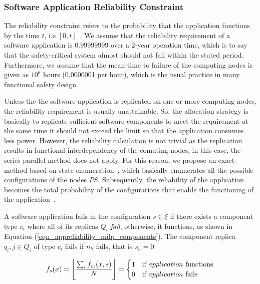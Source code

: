 \subsubsection{Software Application Reliability Constraint}
The reliability constraint refers to the probability that the application functions by the time $t$, i.e $[0,t]$~\cite{Goel1985SoftwareApplicability}. We assume that the reliability requirement of a software application is 0.99999999 over a 2-year operation time, which is to say  that the safety-critical system almost should not fail within the stated period. Furthermore, we assume that the mean-time to failure of the computing nodes is given as $10^6$ hours (0.0000001 per hour), which is the usual practice in many functional safety design.

Unless the the software application is replicated on one or more computing nodes, the reliability requirement is usually unattainable. So, the allocation strategy is basically to replicate sufficient software components to meet the requirement at the same time it should not exceed the limit so that the application consumes less power. However, the reliability calculation is not trivial as the replication results in functional interdependency of the comuting nodes, in this case,  the series-parallel method does not apply. For this reason, we propose an exact method based on state enumeration~\cite{ExactMethodstoComputeNetworkRe- liability}, which basically enumerates all the possible configurations of the nodes  $PS$. Subsequently, the reliability of the application becomes the total probability of the configurations that enable the functioning of the application~\cite{Mahmud5222}.
\begin{definition}
	A software application fails in the configuration $s\in\xi$ if there exists a component type $c_i$ where all of its replicas $Q_i$ \textit{fail}, otherwise, it functions, as shown in Equation (\ref{eqn_appreliability_milp_components}).  The component replica $q_i,j\in Q_i$ of type $c_i$ fails if $n_h$ fails, that is $s_h=0$.
\end{definition}
\begin{align}
f_s(x) = \floor[\Bigg]{\frac{\sum_if_{c_i}(x,s)}{N}}=
\begin{cases}
1 & \mbox{if } application \mbox{ functions}\\
0 & \mbox{if } application \mbox{ fails}
\end{cases}\label{eqn_appreliability_milp_components}
\end{align}

